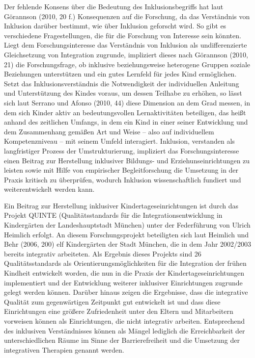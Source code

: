 Der fehlende Konsens über die Bedeutung des Inklusionsbegriffs hat laut Görannson (2010, 20 f.) Konsequenzen auf die Forschung, da das Verständnis von Inklusion darüber bestimmt, wie über Inklusion geforscht wird. So gibt es verschiedene Fragestellungen, die für die Forschung von Interesse sein könnten. Liegt dem Forschungsinteresse das Verständnis von Inklusion als undifferenzierte Gleichsetzung von Integration zugrunde, impliziert dieses nach Görannson (2010, 21) die Forschungsfrage, ob inklusive beziehungsweise heterogene Gruppen soziale Beziehungen unterstützen und ein gutes Lernfeld für jedes Kind ermöglichen. Setzt das Inklusionsverständnis die Notwendigkeit der individuellen Anleitung und Unterstützung des Kindes voraus, um dessen Teilhabe zu erhöhen, so lässt sich laut Serrano und Afonso (2010, 44) diese Dimension an dem Grad messen, in dem sich Kinder aktiv an bedeutungsvollen Lernaktivitäten beteiligen, das heißt anhand des zeitlichen Umfangs, in dem ein Kind in einer seiner Entwicklung und dem Zusammenhang gemäßen Art und Weise -- also auf individuellem Kompetenzniveau -- mit seinem Umfeld interagiert.
Inklusion, verstanden als langfristiger Prozess der Umstrukturierung, impliziert das Forschungsinteresse einen Beitrag zur Herstellung inklusiver Bildungs- und Erziehunseinrichtungen zu leisten sowie mit Hilfe von empirischer Begleitforschung die Umsetzung in der Praxis kritisch zu überprüfen, wodurch Inklusion wissenschaftlich fundiert und weiterentwickelt werden kann.

Ein Beitrag zur Herstellung inklusiver Kindertageseinrichtungen ist durch das Projekt QUINTE (Qualitätsstandards für die Integrationsentwicklung in Kindergärten der Landeshauptstadt München) unter der Federführung von Ulrich Heimlich erfolgt. An diesem Forschungsprojekt beteiligten sich laut Heimlich und Behr (2006, 200) elf Kindergärten der Stadt München, die in dem Jahr 2002/2003 bereits integrativ arbeiteten. Als Ergebnis dieses Projekts sind 26 Qualitätsstandards als Orientierungsmöglichkeiten für die Integration der frühen Kindheit entwickelt worden, die nun in die Praxis der Kindertageseinrichtungen implementiert und der Entwicklung weiterer inklusiver Einrichtungen zugrunde gelegt werden können. 
Darüber hinaus zeigen die Ergebnisse, dass die integrative Qualität zum gegenwärtigen Zeitpunkt gut entwickelt ist und dass diese Einrichtungen eine größere Zufriedenheit unter den Eltern und Mitarbeitern vorweisen können als Einrichtungen, die nicht integrativ arbeiten. Entsprechend des inklusiven Verständnisses können als Mängel lediglich die Erreichbarkeit der unterschiedlichen Räume im Sinne der Barrierefreiheit und die Umsetzung der integrativen Therapien genannt werden.  

